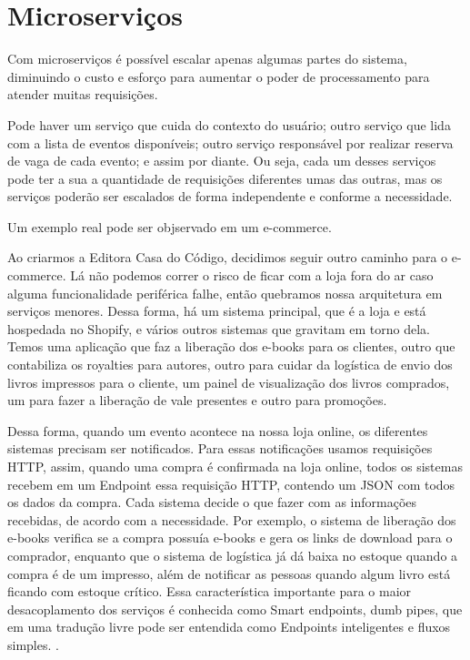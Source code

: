 \chapter{Microserviços}

Com microserviços é possível escalar apenas algumas partes do sistema, diminuindo
o custo e esforço para aumentar o poder de processamento para atender muitas requisições.

Pode haver um serviço que cuida do contexto do usuário; outro serviço que lida com a
lista de eventos disponíveis; outro serviço responsável por realizar reserva de vaga de
cada evento; e assim por diante. Ou seja, cada um desses serviços pode ter a sua a quantidade
de requisições diferentes umas das outras, mas os serviços poderão ser escalados de forma
independente e conforme a necessidade.

Um exemplo real pode ser objservado em um e-commerce.

\begin{citacao}

Ao criarmos a Editora Casa do Código, decidimos seguir outro caminho para o e-commerce.
Lá não podemos correr o risco de ficar com a loja fora do ar caso alguma funcionalidade
periférica falhe, então quebramos nossa arquitetura em serviços menores. Dessa forma, há
um sistema principal, que é a loja e está hospedada no Shopify, e vários outros sistemas
que gravitam em torno dela. Temos uma aplicação que faz a liberação dos e-books para os
clientes, outro que contabiliza os royalties para autores, outro para cuidar da logística
de envio dos livros impressos para o cliente, um painel de visualização dos livros comprados,
um para fazer a liberação de vale presentes e outro para promoções.

Dessa forma, quando um evento acontece na nossa loja online, os diferentes sistemas precisam
ser notificados. Para essas notificações usamos requisições HTTP, assim, quando uma compra
é confirmada na loja online, todos os sistemas recebem em um Endpoint essa requisição HTTP,
contendo um JSON com todos os dados da compra. Cada sistema decide o que fazer com as informações
recebidas, de acordo com a necessidade. Por exemplo, o sistema de liberação dos e-books verifica
se a compra possuía e-books e gera os links de download para o comprador, enquanto que o sistema
de logística já dá baixa no estoque quando a compra é de um impresso, além de notificar as pessoas
quando algum livro está ficando com estoque crítico. Essa característica importante para o maior
desacoplamento dos serviços é conhecida como Smart endpoints, dumb pipes, que em uma tradução
livre pode ser entendida como Endpoints inteligentes e fluxos
simples. \cite{arquitetura-de-microservicos-ou-monolitica}.

\end{citacao}


